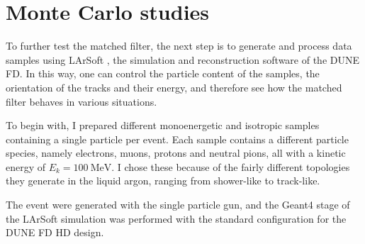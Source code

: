 \section{Monte Carlo studies}
\label{sec:matched_filter_mc_studies}

To further test the matched filter, the next step is to generate and process data samples using LArSoft \cite{Church2013}, the simulation and reconstruction software of the DUNE FD. In this way, one can control the particle content of the samples, the orientation of the tracks and their energy, and therefore see how the matched filter behaves in various situations.

To begin with, I prepared different monoenergetic and isotropic samples containing a single particle per event. Each sample contains a different particle species, namely electrons, muons, protons and neutral pions, all with a kinetic energy of $E_{k} = 100 \ \mathrm{MeV}$. I chose these because of the fairly different topologies they generate in the liquid argon, ranging from shower-like to track-like.

The event were generated with the single particle gun, and the Geant4 stage of the LArSoft simulation \cite{Church2013} was performed with the standard configuration for the DUNE FD HD design.

